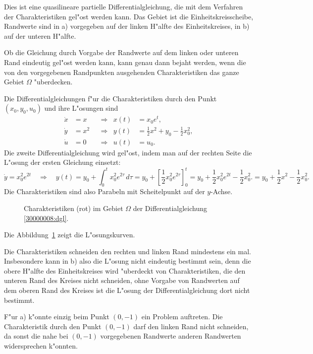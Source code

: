 \begin{loesung}
Dies ist eine quasilineare partielle Differentialgleichung, die mit dem
Verfahren der Charakteristiken gel"ost werden kann.
Das Gebiet ist die Einheitskreisscheibe, Randwerte sind in a) vorgegeben
auf der linken H"alfte des Einheitskreises, in b) auf der unteren H"alfte.

Ob die Gleichung durch Vorgabe der Randwerte auf dem linken oder unteren Rand
eindeutig gel"ost werden kann, kann genau dann bejaht werden, wenn die 
von den vorgegebenen Randpunkten
ausgehenden Charakteristiken das ganze Gebiet $\Omega$ "uberdecken.

Die Differentialgleichungen f"ur die Charakteristiken durch den Punkt
$(x_0,y_0,u_0)$ und ihre L"osungen sind
\begin{align*}
\dot x&=x&&\Rightarrow&x(t)&=x_0e^t,\\
\dot y&=x^2&&\Rightarrow&y(t)&=\frac12x^2+y_0-\frac12x_0^2,\\
\dot u&=0&&\Rightarrow&u(t)&=u_0.
\end{align*}
Die zweite Differentialgleichung wird gel"ost, indem man auf der rechten
Seite die L"osung der ersten Gleichung einsetzt:
\[
\dot y=x_0^2e^{2t}
\quad\Rightarrow\quad
y(t)
=y_0 + \int_0^tx_0^2e^{2\tau}\,d\tau
=y_0 + \left[\frac12x_0^2e^{2\tau}\right]_0^t
=y_0 + \frac12x_0^2e^{2t}-\frac12x_0^2.
=y_0 + \frac12x^2-\frac12x_0^2.
\]
Die Charakteristiken sind also Parabeln mit Scheitelpunkt auf der
$y$-Achse.
\begin{figure}
\begin{center}
\end{center}
\caption{Charakteristiken (rot) im Gebiet $\Omega$ der Differentialgleichung
\eqref{30000008:dgl}.\label{30000008:domain}}
\end{figure}
Die Abbildung~\ref{30000008:domain} zeigt die L"osungskurven.

Die Charakteristiken schneiden den rechten und linken Rand mindestens ein mal.
Insbesondere kann in b) also die L"osung nicht eindeutig bestimmt sein, denn
die obere H"alfte des Einheitskreises wird "uberdeckt von
Charakteristiken, die den unteren Rand des Kreises nicht schneiden,
ohne Vorgabe von Randwerten auf dem oberen Rand des Kreises ist die
L"osung der Differentialgleichung dort nicht bestimmt.

F"ur a) k"onnte einzig beim Punkt $(0,-1)$ ein Problem auftreten.
Die Charakteristik durch den
Punkt $(0,-1)$ darf den linken Rand nicht schneiden, da sonst die 
nahe bei $(0,-1)$ vorgegebenen Randwerte anderen Randwerten widersprechen
k"onnten.


\end{loesung}
